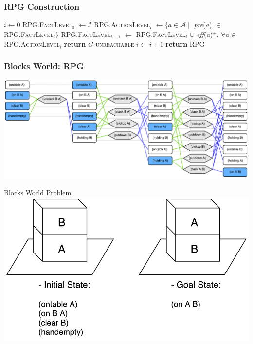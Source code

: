 \documentclass{beamer}
\begin{document}
	\begin{frame}[c]\frametitle{RPG Construction}
		\begin{algorithmic}[1]
			\small
		    		\State $i \gets 0$
		    		\State \textsc{RPG.FactLevel$_{0}$} $\gets \mathcal{I}$
		    			\State \textsc{RPG.ActionLevel$_{i}$} $\gets \lbrace a \in \mathcal{A} \mid$ \textit{pre}($a$) $\in$ \textsc{RPG.FactLevel$_{i}$}$\rbrace$
		    			\State \textsc{RPG.FactLevel$_{i+1}$} $\gets$ \textsc{RPG.FactLevel$_{i}$} $\cup$ \textit{eff}($a$)$^+$, $\forall a \in$ \textsc{RPG.ActionLevel$_{i}$}
						\State \textbf{return} $G$ \textsc{unreachable} 
					\EndIf
		    			\State $i \gets i + 1$
		    		\EndWhile
		        \State \textbf{return} \textsc{RPG}
		    \EndFunction
		\end{algorithmic}
	\end{frame}
	
	\begin{frame}[c]\frametitle{Blocks World: RPG}
		\begin{center}
			\includegraphics[width=\textwidth]{fig/blocksworld-landmarks-rpg.pdf}
		\end{center}
		\vspace{-2cm}
		Blocks World Problem\\
		\includegraphics[width=.5\textwidth]{fig/blocksworld-problem.pdf}
	\end{frame}
\end{document}
